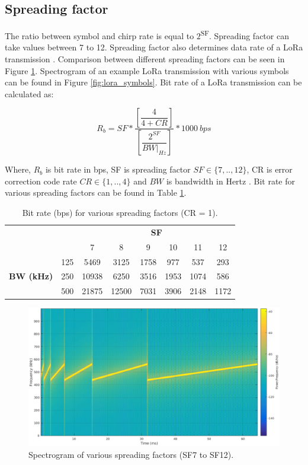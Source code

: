 \subsection{Spreading factor}

The ratio between symbol and chirp rate is equal to $2$\textsuperscript{SF}. Spreading factor can take values between 7 to 12. Spreading factor also determines data rate of a LoRa transmission \cite{AN1200.22}. Comparison between different spreading factors can be seen in Figure \ref{fig:lora_sf_comparasion}. Spectrogram of an example LoRa transmission with various symbols can be found in Figure \ref{fig:lora_symbols}. Bit rate of a LoRa transmission can be calculated as:

\begin{equation} \label{eq:bit_rate_sf}
R_{b} = SF * \dfrac{\left[ \dfrac{4}{4+CR} \right] }{ \left[ \dfrac{2^{SF}}{BW|_{Hz}} \right]} * 1000 \ bps
\end{equation}

Where, $R_{b}$ is bit rate in bps, SF is spreading factor $SF \in \{7,..,12\}$, CR is error correction code rate $CR \in \{1,..,4\}$ and $BW$ is bandwidth in Hertz \cite{AN1200.22}. Bit rate for various spreading factors can be found in Table \ref{table:sf_data_rate}.

\begin{table}
\centering
\caption{Bit rate (bps) for various spreading factors (CR = 1).}
\label{table:sf_data_rate}
\begin{tabular}{|c|c|c|c|c|c|c|c|}
\hline
\multicolumn{2}{|c|}{\multirow{2}{*}{}} & \multicolumn{6}{c|}{\textbf{SF}} \\ \cline{3-8}
\multicolumn{2}{|c|}{}                  &    7 &    8 &    9 &   10 &   11 &   12 \\ \hline
\multirow{3}{*}{\textbf{BW (kHz)}}  & 125 & 5469 & 3125 & 1758 & 977 & 537 & 293 \\ \cline{2-8}
                                    & 250 & 10938 & 6250 & 3516 & 1953 & 1074 & 586 \\ \cline{2-8}
                                    & 500 & 21875 & 12500 & 7031 & 3906 & 2148 & 1172 \\ \hline
\end{tabular}
\end{table}

\begin{figure}
\centering
\includegraphics[width=.7\linewidth]{fig/lora_sf_comparasion.png}
\vspace*{4mm}
\caption{Spectrogram of various spreading factors (SF7 to SF12). \cite{sghoslya_lora}}
\label{fig:lora_sf_comparasion}
\end{figure}

